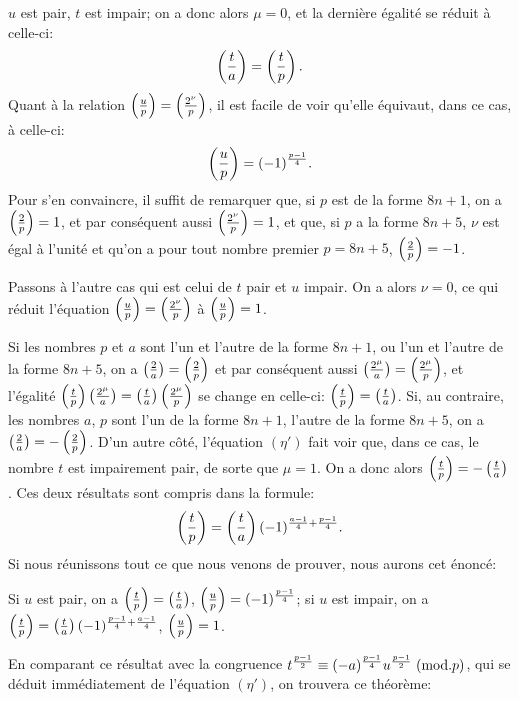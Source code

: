 \noindent
$u$ est pair, $t$ est impair; on a donc alors $\mu=0$, et la dernière égalité se réduit
à celle-ci:
\[
\left(\frac{t}{a}\right)=\left(\frac{t}{p}\right).
\]
Quant à la relation $\left(\frac{u}{p}\right)=\left(\frac{2^\nu}{p}\right)$, il est facile de voir qu'elle équivaut, dans
ce cas, à celle-ci:
\[
\left(\frac{u}{p}\right)=(-1)^{\frac{p-1}{4}}.
\]
Pour s'en convaincre, il suffit de remarquer que, si $p$ est de la forme $8n+1$,
on a $\left(\frac{2}{p}\right)=1$, et par conséquent aussi $\left(\frac{2^\nu}{p}\right)=1$, et que, si $p$ a la forme
$8n+5$, $\nu$ est égal à l'unité et qu'on a pour tout nombre premier $p=8n+5$,
$\left(\frac{2}{p}\right)=-1$.
\par\indent
Passons à l'autre cas qui est celui de $t$ pair et $u$ impair. On a alors
$\nu=0$, ce qui réduit l'équation $\left(\frac{u}{p}\right)=\left(\frac{2^\nu}{p}\right)$ à $\left(\frac{u}{p}\right)=1$.
\par\indent
Si les nombres $p$ et $a$ sont l'un et l'autre de la forme $8n+1$, ou l'un
et l'autre de la forme $8n+5$, on a $\left(\frac{2}{a}\right)=\left(\frac{2}{p}\right)$ et par conséquent aussi
$\left(\frac{2^\mu}{a}\right)=\left(\frac{2^\mu}{p}\right)$, et l'égalité $\left(\frac{t}{p}\right)\left(\frac{2^\mu}{a}\right)=\left(\frac{t}{a}\right)\left(\frac{2^\mu}{p}\right)$ se change en celle-ci:
$\left(\frac{t}{p}\right)=\left(\frac{t}{a}\right)$. Si, au contraire, les nombres $a$, $p$ sont l'un de la forme $8n+1$,
l'autre de la forme $8n+5$, on a $\left(\frac{2}{a}\right)=-\left(\frac{2}{p}\right)$. D'un autre côté, l'équation
$(\eta')$ fait voir que, dans ce cas, le nombre $t$ est impairement pair, de sorte que
$\mu=1$. On a donc alors $\left(\frac{t}{p}\right)=-\left(\frac{t}{a}\right)$. Ces deux résultats sont compris
dans la formule:
\[
\left(\frac{t}{p}\right)=\left(\frac{t}{a}\right)(-1)^{\frac{a-1}{4}+\frac{p-1}{4}}.
\]
Si nous réunissons tout ce que nous venons de prouver, nous aurons cet énoncé:
\par\noindent\hspace*{.06\linewidth}\begin{minipage}{.94\linewidth}
\indent Si $u$ est pair, on a $\left(\frac{t}{p}\right)=\left(\frac{t}{a}\right)$, $\left(\frac{u}{p}\right)=(-1)^{\frac{p-1}{4}}$; si $u$ est impair,
on a $\left(\frac{t}{p}\right)=\left(\frac{t}{a}\right)(-1)^{\frac{p-1}{4}+\frac{a-1}{4}}$, $\left(\frac{u}{p}\right)=1$.
\end{minipage}
\par\indent
En comparant ce résultat avec la congruence $t^{\frac{p-1}{2}}\equiv(-a)^{\frac{p-1}{4}}u^{\frac{p-1}{2}}\;(\mathrm{mod}.p)$,
qui se déduit immédiatement de l'équation $(\eta')$, on trouvera ce théorème:
